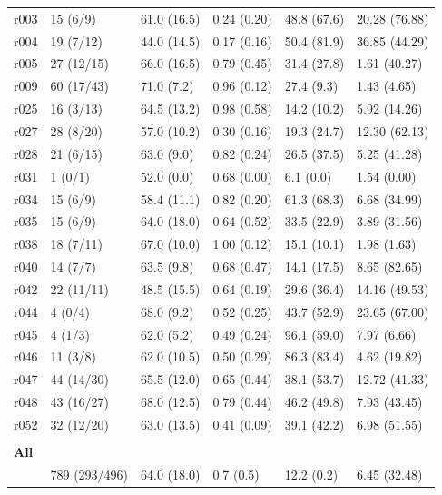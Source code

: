 \documentclass[10pt]{article}
\begin{document}
\begin{table}[h]
\begin{tabular}{llllll}
r003 & 15 (6/9) & 61.0 (16.5) & 0.24 (0.20) & 48.8 (67.6) & 20.28 (76.88) \\
r004 & 19 (7/12) & 44.0 (14.5) & 0.17 (0.16) & 50.4 (81.9) & 36.85 (44.29) \\
r005 & 27 (12/15) & 66.0 (16.5) & 0.79 (0.45) & 31.4 (27.8) & 1.61 (40.27) \\
r009 & 60 (17/43) & 71.0 (7.2) & 0.96 (0.12) & 27.4 (9.3) & 1.43 (4.65) \\
r025 & 16 (3/13) & 64.5 (13.2) & 0.98 (0.58) & 14.2 (10.2) & 5.92 (14.26) \\
r027 & 28 (8/20) & 57.0 (10.2) & 0.30 (0.16) & 19.3 (24.7) & 12.30 (62.13) \\
r028 & 21 (6/15) & 63.0 (9.0) & 0.82 (0.24) & 26.5 (37.5) & 5.25 (41.28) \\
r031 & 1 (0/1) & 52.0 (0.0) & 0.68 (0.00) & 6.1 (0.0) & 1.54 (0.00) \\
r034 & 15 (6/9) & 58.4 (11.1) & 0.82 (0.20) & 61.3 (68.3) & 6.68 (34.99) \\
r035 & 15 (6/9) & 64.0 (18.0) & 0.64 (0.52) & 33.5 (22.9) & 3.89 (31.56) \\
r038 & 18 (7/11) & 67.0 (10.0) & 1.00 (0.12) & 15.1 (10.1) & 1.98 (1.63) \\
r040 & 14 (7/7) & 63.5 (9.8) & 0.68 (0.47) & 14.1 (17.5) & 8.65 (82.65) \\
r042 & 22 (11/11) & 48.5 (15.5) & 0.64 (0.19) & 29.6 (36.4) & 14.16 (49.53) \\
r044 & 4 (0/4) & 68.0 (9.2) & 0.52 (0.25) & 43.7 (52.9) & 23.65 (67.00) \\
r045 & 4 (1/3) & 62.0 (5.2) & 0.49 (0.24) & 96.1 (59.0) & 7.97 (6.66) \\
r046 & 11 (3/8) & 62.0 (10.5) & 0.50 (0.29) & 86.3 (83.4) & 4.62 (19.82) \\
r047 & 44 (14/30) & 65.5 (12.0) & 0.65 (0.44) & 38.1 (53.7) & 12.72 (41.33) \\
r048 & 43 (16/27) & 68.0 (12.5) & 0.79 (0.44) & 46.2 (49.8) & 7.93 (43.45) \\
r052 & 32 (12/20) & 63.0 (13.5) & 0.41 (0.09) & 39.1 (42.2) & 6.98 (51.55) \\
 & & & & &\\
\textbf{All}  & & & & &\\
\arrayrulecolor{black!30}\midrule
& 789 (293/496) & 64.0 (18.0) & 0.7 (0.5) & 12.2 (0.2) & 6.45 (32.48) \\
\bottomrule
\end{tabular}
\end{table}
\end{document}
